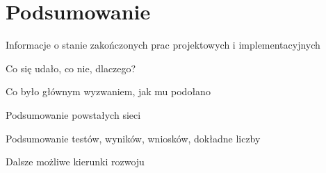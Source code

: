 \chapter{Podsumowanie}
\thispagestyle{chapterBeginStyle}
\label{chapter7}

Informacje o stanie zakończonych prac projektowych i implementacyjnych

Co się udało, co nie, dlaczego?

Co było głównym wyzwaniem, jak mu podołano

Podsumowanie powstałych sieci

Podsumowanie testów, wyników, wniosków, dokładne liczby

Dalsze możliwe kierunki rozwoju
